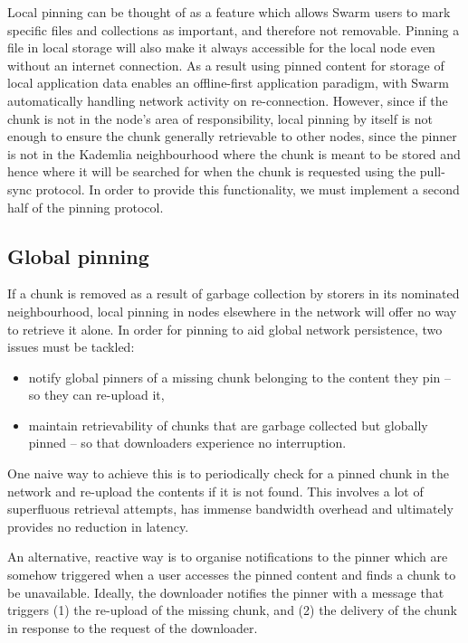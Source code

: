 Local pinning can be thought of as a feature which allows Swarm users to mark specific files and collections as important, and therefore not removable. Pinning a file in local storage will also make it always accessible for the local node even without an internet connection. As a result using pinned content for storage of local application data enables an offline-first application paradigm, with Swarm automatically handling network activity on re-connection. However, since if the chunk is not in the node's area of responsibility, local pinning by itself is not enough to ensure the chunk generally retrievable to other nodes, since the pinner is not in the Kademlia neighbourhood where the chunk is meant to be stored and hence where it will be searched for when the chunk is requested using the pull-sync protocol. In order to provide this functionality, we must implement a second half of the pinning protocol.

\subsection{Global pinning}\label{sec:global-pinning}

If a chunk is removed as a result of garbage collection by storers in its nominated neighbourhood, local pinning in nodes elsewhere in the network will offer no way to retrieve it alone. In order for pinning to aid global network persistence, two issues must be tackled:

\begin{itemize}[noitemsep]
    \item  notify global pinners of a missing chunk belonging to the content they pin -- so they can re-upload it,
    \item  maintain retrievability of chunks that are garbage collected but globally pinned -- so that downloaders experience no interruption. 
\end{itemize}

One naive way to achieve this is to periodically check for a pinned chunk in the network and re-upload the contents if it is not found. This involves a lot of superfluous retrieval attempts, has immense bandwidth overhead and ultimately provides no reduction in latency.

An alternative, reactive way is to organise notifications to the pinner which are somehow triggered when a user accesses the pinned content and finds a chunk to be unavailable. Ideally, the downloader notifies the pinner with a message that triggers (1) the re-upload of the missing chunk, and (2) the delivery of the chunk in response to the request of the downloader.  

